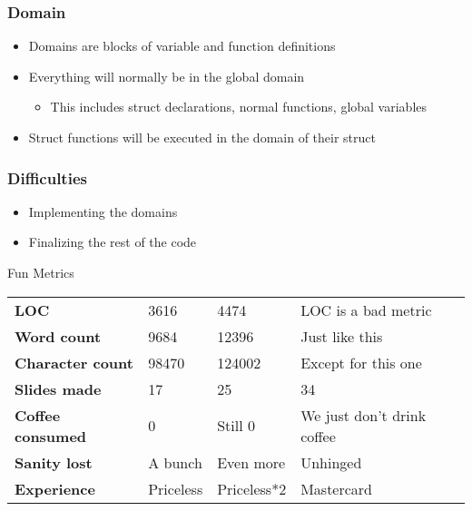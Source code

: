 \documentclass{beamer}
\begin{document}
\begin{frame}
\frametitle{Domain}
\begin{itemize}
\item Domains are blocks of variable and function definitions
\item Everything will normally be in the global domain
\begin{itemize}
\item This includes struct declarations, normal functions, global variables
\end{itemize}
\item Struct functions will be executed in the domain of their struct
\end{itemize}
\end{frame}

\begin{frame}
\frametitle{Difficulties}
\begin{itemize}
\item Implementing the domains
\item Finalizing the rest of the code
\end{itemize}
\end{frame}

\begin{frame}
\begin{block}{Fun Metrics}
\begin{tabular}{l || l | l | l}
\textbf{LOC} & 3616 & 4474 & LOC is a bad metric\\
\textbf{Word count} & 9684 & 12396 & Just like this\\
\textbf{Character count} & 98470 & 124002 & Except for this one\\
\textbf{Slides made} & 17 & 25 & 34\\
\textbf{Coffee consumed} & 0 & Still 0 & We just don't drink coffee\\
\textbf{Sanity lost} & A bunch & Even more & Unhinged\\
\textbf{Experience} & Priceless & Priceless*2 & Mastercard
\end{tabular}
\end{block}
\end{frame}

\begin{frame}
\end{frame}
\end{document}
